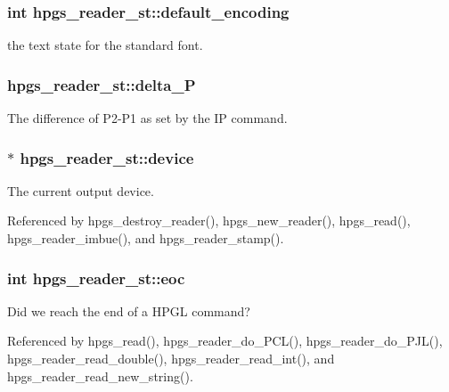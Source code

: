 \subsubsection[{default\_\-encoding}]{\setlength{\rightskip}{0pt plus 5cm}int {\bf hpgs\_\-reader\_\-st::default\_\-encoding}}\label{structhpgs__reader__st_a0309333a8f568b4c953c19573d7382e1}
the text state for the standard font. 
\subsubsection[{delta\_\-P}]{ {\bf hpgs\_\-reader\_\-st::delta\_\-P}}\label{structhpgs__reader__st_a46a3367b70f96e3b9d33750ac3b964f9}
The difference of P2-\/P1 as set by the IP command. 
\subsubsection[{device}]{$\ast$ {\bf hpgs\_\-reader\_\-st::device}}\label{structhpgs__reader__st_a638ea28d18384d24ac73eca74675b3e1}
The current output device. 

Referenced by hpgs\_\-destroy\_\-reader(), hpgs\_\-new\_\-reader(), hpgs\_\-read(), hpgs\_\-reader\_\-imbue(), and hpgs\_\-reader\_\-stamp().

\subsubsection[{eoc}]{\setlength{\rightskip}{0pt plus 5cm}int {\bf hpgs\_\-reader\_\-st::eoc}}\label{structhpgs__reader__st_af6ab3ba49fa4700f2f4abd6cf4c251f6}
Did we reach the end of a HPGL command? 

Referenced by hpgs\_\-read(), hpgs\_\-reader\_\-do\_\-PCL(), hpgs\_\-reader\_\-do\_\-PJL(), hpgs\_\-reader\_\-read\_\-double(), hpgs\_\-reader\_\-read\_\-int(), and hpgs\_\-reader\_\-read\_\-new\_\-string().

